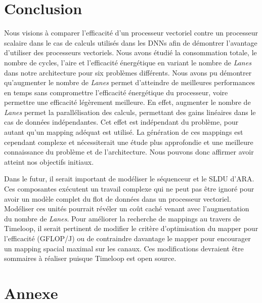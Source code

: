 \documentclass[11pt,letterpaper]{article}
\begin{document}
\section{Conclusion}
\begin{multicols}{2}

    Nous visions à comparer l'efficacité d'un processeur vectoriel contre un processeur 
    scalaire dans le cas de calculs utilisés dans les DNNs afin de démontrer l'avantage 
    d'utiliser des processeurs vectoriels. Nous avons étudié la consommation totale, le 
    nombre de cycles, l'aire et l'efficacité énergétique en variant le nombre de \textit{Lanes} 
    dans notre architecture pour six problèmes différents. Nous avons pu démontrer 
    qu'augmenter le nombre de \textit{Lanes} permet d'atteindre de meilleures performances 
    en temps sans compromettre l'efficacité énergétique du processeur, voire permettre une 
    efficacité légèrement meilleure. En effet, augmenter le nombre de \textit{Lanes} permet 
    la parallélisation des calculs, permettant des gains linéaires dans le cas de données 
    indépendantes. Cet effet est indépendant du problème, pour autant qu'un mapping adéquat 
    est utilisé. La génération de ces mappings est cependant complexe et nécessiterait une 
    étude plus approfondie et une meilleure connaissance du problème et de l'architecture.
    Nous pouvons donc affirmer avoir atteint nos objectifs initiaux.

    Dans le futur, il serait important de modéliser le séquenceur et le SLDU d'ARA. Ces 
    composantes exécutent un travail complexe qui ne peut pas être ignoré pour avoir un 
    modèle complet du flot de données dans un processeur vectoriel. Modéliser ces unités 
    pourrait révéler un coût caché venant avec l'augmentation du nombre de \textit{Lanes}.
    Pour améliorer la recherche de mappings au travers de Timeloop, il serait pertinent 
    de modifier le critère d'optimisation du mapper pour l'efficacité (GFLOP/J) ou de contraindre
    davantage le mapper pour encourager un mapping spacial maximal sur les canaux. Ces 
    modifications devraient être sommaires à réaliser puisque Timeloop est open source.
    
    \end{multicols}

{}
    

\pagebreak
\section*{Annexe}
\end{document}
